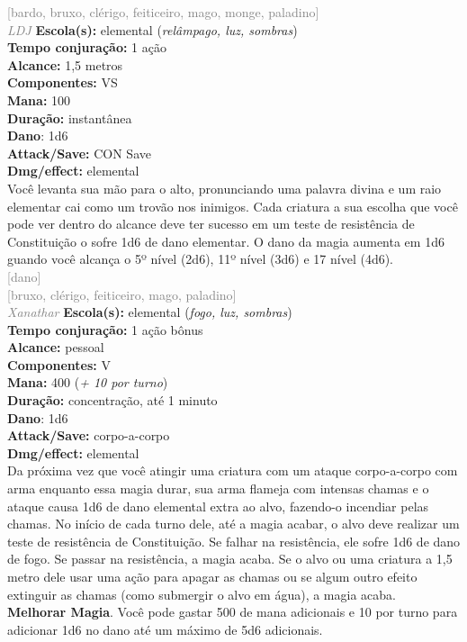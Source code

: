 \documentclass{RPG_Adventure}[2021/10/20]
\begin{document}
{\scriptsize \textcolor{gray}{[bardo, bruxo, clérigo, feiticeiro, mago, monge, paladino]\\}}
{\tiny \textcolor{gray}{\textit{LDJ}}}
{\small \t \textbf{Escola(s):} elemental (\textit{relâmpago, luz, sombras})\\\t \textbf{Tempo conjuração:} 1 ação\\\t \textbf{Alcance:} 1,5 metros\\\t \textbf{Componentes:} VS\\\t \textbf{Mana:} 100\\\t \textbf{Duração:} instantânea\\\t \textbf{Dano}: 1d6\\\t \textbf{Attack/Save:} CON Save\\\t \textbf{Dmg/effect:} elemental\\}
{\normalsize Você levanta sua mão para o alto, pronunciando uma palavra divina e um raio elementar cai como um trovão nos inimigos. Cada criatura a sua escolha que você pode ver dentro do alcance deve ter sucesso em um teste de resistência de Constituição o sofre 1d6 de dano elementar. O dano da magia aumenta em 1d6 guando você alcança o 5º nível (2d6), 11º nível (3d6) e 17 nível (4d6).\\}
{\scriptsize \textcolor{gray}{[dano]\\}}
{\scriptsize \textcolor{gray}{[bruxo, clérigo, feiticeiro, mago, paladino]\\}}
{\tiny \textcolor{gray}{\textit{Xanathar}}}
{\small \t \textbf{Escola(s):} elemental (\textit{fogo, luz, sombras})\\\t \textbf{Tempo conjuração:} 1 ação bônus\\\t \textbf{Alcance:} pessoal\\\t \textbf{Componentes:} V\\\t \textbf{Mana:} 400 (\textit{+ 10 por turno})\\\t \textbf{Duração:} concentração, até 1 minuto\\\t \textbf{Dano}: 1d6\\\t \textbf{Attack/Save:} corpo-a-corpo\\\t \textbf{Dmg/effect:} elemental\\}
{\normalsize Da próxima vez que você atingir uma criatura com um ataque corpo-a-corpo com arma enquanto essa magia durar, sua arma flameja com intensas chamas e o ataque causa 1d6 de dano elemental extra ao alvo, fazendo-o incendiar pelas chamas. No início de cada turno dele, até a magia acabar, o alvo deve realizar um teste de resistência de Constituição. Se falhar na resistência, ele sofre 1d6 de dano de fogo. Se passar na resistência, a magia acaba. Se o alvo ou uma criatura a 1,5 metro dele usar uma ação para apagar as chamas ou se algum outro efeito extinguir as chamas (como submergir o alvo em água), a magia acaba.\\\t \textbf{Melhorar Magia}. Você pode gastar 500 de mana adicionais e 10 por turno para adicionar 1d6 no dano até um máximo de 5d6 adicionais.\\}
\end{document}
